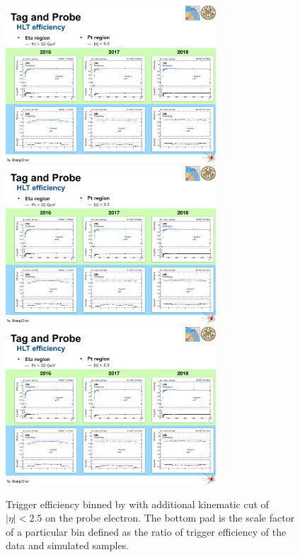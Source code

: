 \begin{figure}\centering
    \includegraphics[width=0.7\textwidth]{figure/appendix_16pt.pdf}
    \includegraphics[width=0.7\textwidth]{figure/appendix_17pt.pdf}
    \includegraphics[width=0.7\textwidth]{figure/appendix_18pt.pdf}
    \caption[Trigger efficiency binned by \PT]
    {
        Trigger efficiency binned by \PT with additional kinematic cut of $|\eta|<2.5$ on the probe electron.
        The bottom pad is the scale factor of a particular bin defined as the ratio of trigger efficiency of the data and simulated samples.
    }
    \label{fig:appendix_pteff}
\end{figure}

